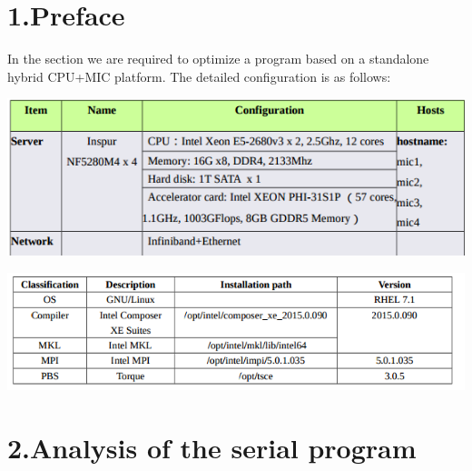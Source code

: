 \documentclass{article}
\begin{document}
\mdxtitleblockstart{}
\mdxauthorstart{}
\mdxauthorend\mdtitleauthorrunning{}{}\mdxtitleblockend%

\section{1.\hspace*{0.5em}Preface}\label{sec-preface}%

\noindent{}In the section we are required to optimize a 
program based on a standalone hybrid CPU+MIC platform. The detailed
configuration is as follows:%

\includegraphics[keepaspectratio=true,width=\dimmin{}{\dimwidth{0.90}}]{images/2016-02-18-23-01-13-}{}%

\noindent{}\includegraphics[keepaspectratio=true,width=\dimmin{}{\dimwidth{0.90}}]{images/2016-02-18-23-13-11-}{}%

\section{2.\hspace*{0.5em}Analysis of the serial program}\label{sec-analysis-of-the-serial-program}%
\end{document}
